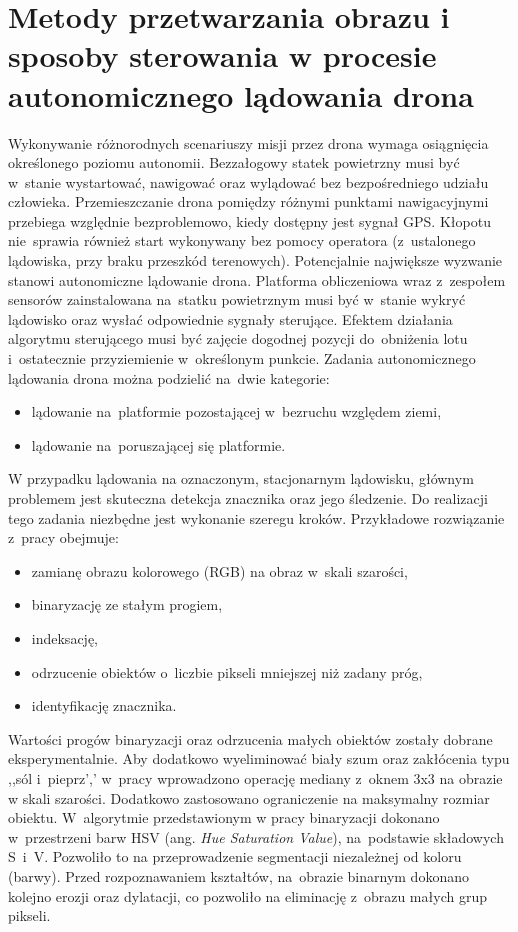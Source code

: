 \chapter{Metody przetwarzania obrazu i sposoby sterowania w procesie autonomicznego lądowania drona}
\label{cha:metody}

Wykonywanie różnorodnych scenariuszy misji przez drona wymaga osiągnięcia określonego poziomu autonomii. Bezzałogowy statek powietrzny musi być w~stanie wystartować, nawigować oraz wylądować bez bezpośredniego udziału człowieka. 
Przemieszczanie drona pomiędzy różnymi punktami nawigacyjnymi przebiega względnie bezproblemowo, kiedy dostępny jest sygnał GPS. 
Kłopotu nie~sprawia również start wykonywany bez pomocy operatora (z~ustalonego lądowiska, przy braku przeszkód terenowych). 
Potencjalnie największe wyzwanie stanowi autonomiczne lądowanie drona. 
Platforma obliczeniowa wraz z~zespołem sensorów zainstalowana na~statku powietrznym musi być w~stanie wykryć lądowisko oraz wysłać odpowiednie sygnały sterujące. 
Efektem działania algorytmu sterującego musi być zajęcie dogodnej pozycji do~obniżenia lotu i~ostatecznie przyziemienie w~określonym punkcie. 
Zadania autonomicznego lądowania drona można podzielić na~dwie kategorie:  
\begin{itemize}
	\item lądowanie na~platformie pozostającej w~bezruchu względem ziemi,
	\item lądowanie na~poruszającej się platformie.
\end{itemize}

W przypadku lądowania na oznaczonym, stacjonarnym lądowisku, głównym problemem jest skuteczna detekcja znacznika oraz jego śledzenie. 
Do realizacji tego zadania niezbędne jest wykonanie szeregu kroków.
Przykładowe rozwiązanie z~pracy \cite{Rings} obejmuje:
\begin{itemize}
	\item zamianę obrazu kolorowego (RGB) na obraz w~skali szarości,
	\item binaryzację ze stałym progiem,
	\item indeksację,
	\item odrzucenie obiektów o~liczbie pikseli mniejszej niż zadany próg,
	\item identyfikację znacznika.
\end{itemize}

Wartości progów binaryzacji oraz odrzucenia małych obiektów zostały dobrane eksperymentalnie. 
Aby dodatkowo wyeliminować biały szum oraz zakłócenia typu ,,sól i~pieprz',' w~pracy \cite{H_median} wprowadzono operację mediany z~oknem 3x3 na obrazie w skali szarości. 
Dodatkowo zastosowano ograniczenie na maksymalny rozmiar obiektu. 
W~algorytmie przedstawionym w pracy \cite{FPGA} binaryzacji dokonano w~przestrzeni barw HSV (ang. \textit{Hue Saturation Value}), na~podstawie składowych S~i~V. 
Pozwoliło to na przeprowadzenie segmentacji niezależnej od koloru (barwy). 
Przed rozpoznawaniem kształtów, na~obrazie binarnym dokonano kolejno erozji oraz dylatacji, co  pozwoliło na eliminację z~obrazu małych grup pikseli. \par 

